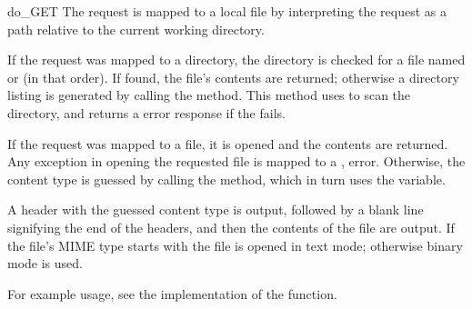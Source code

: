 \begin{methoddesc}{do_GET}{}
The request is mapped to a local file by interpreting the request as
a path relative to the current working directory.

If the request was mapped to a directory, the directory is checked for
a file named  or  (in that order).
If found, the file's contents are returned; otherwise a directory
listing is generated by calling the  method.
This method uses  to scan the directory, and
returns a  error response if the  fails.

If the request was mapped to a file, it is opened and the contents are
returned.  Any  exception in opening the requested
file is mapped to a , 
error. Otherwise, the content type is guessed by calling the
 method, which in turn uses the
 variable.

A  header with the guessed content type is
output, followed by a blank line signifying the end of the headers,
and then the contents of the file are output. If the file's MIME type
starts with  the file is opened in text mode; otherwise
binary mode is used.

For example usage, see the implementation of the 
function.
\end{methoddesc}


\begin{seealso}
\end{seealso}
